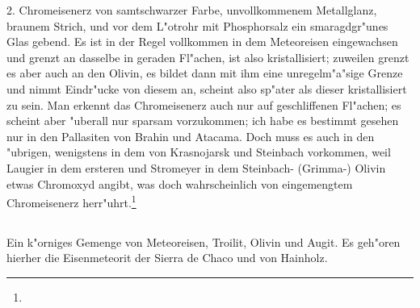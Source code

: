 \documentclass[a4paper, 11pt, oneside]{article}
\begin{document}
2. Chromeisenerz von samtschwarzer Farbe, unvollkommenem Metallglanz, braunem Strich, und vor dem L"otrohr mit Phosphorsalz ein smaragdgr"unes Glas gebend. Es ist in der Regel vollkommen in dem Meteoreisen eingewachsen und grenzt an dasselbe in geraden Fl"achen, ist also kristallisiert; zuweilen grenzt es aber auch an den Olivin, es bildet dann mit ihm eine unregelm"a"sige Grenze und nimmt Eindr"ucke von diesem an, scheint also sp"ater als dieser kristallisiert zu sein. Man erkennt das Chromeisenerz auch nur auf geschliffenen Fl"achen; es scheint aber "uberall nur sparsam vorzukommen; ich habe es bestimmt gesehen nur in den Pallasiten von Brahin und Atacama. Doch muss es auch in den "ubrigen, wenigstens in dem von Krasnojarsk und Steinbach vorkommen, weil Laugier in dem ersteren und Stromeyer in dem Steinbach- (Grimma-) Olivin etwas Chromoxyd angibt, was doch wahrscheinlich von eingemengtem Chromeisenerz herr"uhrt.\footnote{}
\subsection{}
\paragraph{}
Ein k"orniges Gemenge von Meteoreisen, Troilit, Olivin und Augit. Es geh"oren hierher die Eisenmeteorit der Sierra de Chaco und von Hainholz.
\end{document}
